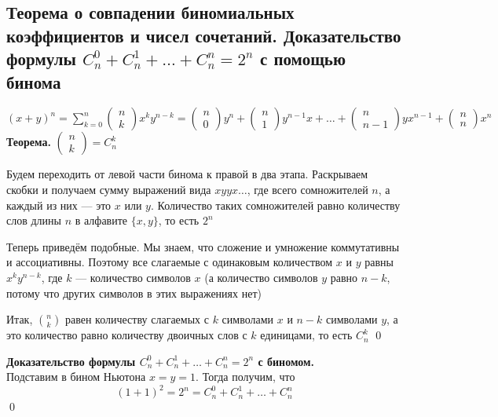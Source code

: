 \documentclass[a4paper]{article}
\begin{document}
\subsection{Теорема о совпадении биномиальных коэффициентов и чисел сочетаний. Доказательство формулы $C^0_n+C^1_n+\ldots+C^n_n=2^n$ с помощью бинома}
 $(x+y)^n=\sum\limits_{k=0}^n \begin{pmatrix}
    n\\
    k
\end{pmatrix}x^ky^{n-k}=\begin{pmatrix}
    n\\
    0
\end{pmatrix}y^n+\begin{pmatrix}
    n\\
    1
\end{pmatrix}y^{n-1}x+\ldots+\begin{pmatrix}
    n\\
    n-1
\end{pmatrix}yx^{n-1}+\begin{pmatrix}
    n\\
    n
\end{pmatrix}x^n$\\[2mm]
\textbf{Теорема.} $\begin{pmatrix}
    n\\
    k
\end{pmatrix}=C_n^k$

\proof Будем переходить от левой части бинома к правой в два этапа. Раскрываем скобки и получаем сумму выражений вида $xyyx\ldots$, где всего сомножителей $n$, а каждый из них — это $x$ или $y$. Количество таких сомножителей равно количеству слов длины $n$ в алфавите $\{x,y\}$, то есть $2^n$

Теперь приведём подобные. Мы знаем, что сложение и умножение коммутативны и ассоциативны. Поэтому все слагаемые с одинаковым количеством $x$ и $y$ равны $x^ky^{n-k}$, где $k$ — количество символов $x$ (а количество символов $y$ равно $n-k$, потому что других символов в этих выражениях нет)

Итак, $\binom{n}{k}$ равен количеству слагаемых с $k$ символами $x$ и $n-k$ символами $y$, а это количество равно количеству двоичных слов с $k$ единицами, то есть $C_n^k$ \qed

\textbf{Доказательство формулы $C^0_n+C^1_n+\ldots+C^n_n=2^n$ с биномом.}\\[2mm]
Подставим в бином Ньютона $x = y = 1$. Тогда получим, что
\begin{equation*}
    (1+1)^2=2^n=C_n^0+C_n^1+\ldots+C_n^n
\end{equation*}\qed 
\end{document}
